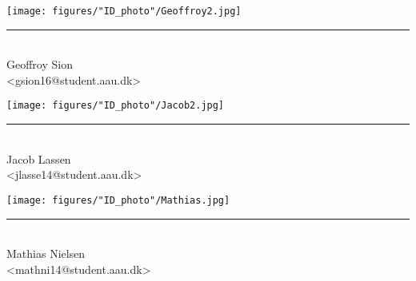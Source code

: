 \begin{center}
\begin{minipage}[b]{0.3\textwidth}
 \centering
 	\texttt{[image: figures/"ID\_photo"/Geoffroy2.jpg]}
 \rule{\textwidth}{0.5pt}\\
  Geoffroy Sion\\
 {\footnotesize <gsion16@student.aau.dk>}
\end{minipage}
\begin{minipage}[b]{0.3\textwidth}
 \centering
 \texttt{[image: figures/"ID\_photo"/Jacob2.jpg]}
 \rule{\textwidth}{0.5pt}\\
  Jacob Lassen\\
 {\footnotesize <jlasse14@student.aau.dk>}
\end{minipage}
\begin{minipage}[b]{0.3\textwidth}
	\centering
	\texttt{[image: figures/"ID\_photo"/Mathias.jpg]}
	\rule{\textwidth}{0.5pt}\\
	Mathias Nielsen\\
	{\footnotesize <mathni14@student.aau.dk>}
\end{minipage}

\end{center}
\vspace{3\baselineskip}

